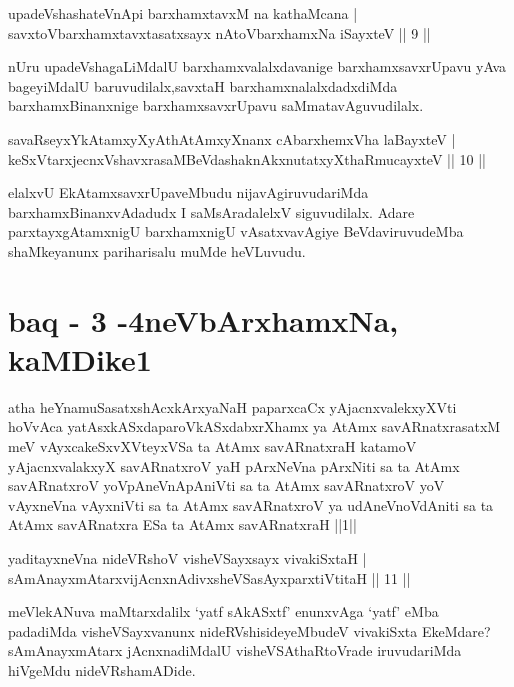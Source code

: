 
\begin{shl}
upadeVshashateVnApi barxhamxtavxM na kathaMcana |\\
savxtoV\s barxhamxtavxtasatxsayx nAtoV\s barxhamxNa iSayxteV \hfill || 9 ||
\end{shl}

\begin{artha}
nUru upadeVshagaLiMdalU barxhamxvalalxdavanige barxhamxsavxrUpavu yAva bageyiMdalU baruvudilalx,savxtaH barxhamxnalalxdadxdiMda barxhamxBinanxnige barxhamxsavxrUpavu saMmatavAguvudilalx.
\end{artha}

\begin{shl}
savaRseyxYkAtamxyXyAthAtAmxyXnanx cAbarxhemxVha laBayxteV |\\
keSxVtarxjecnxVshavxrasaMBeVdashaknAkxnutatxyXthaRmucayxteV \hfill || 10 ||
\end{shl}

\begin{artha}
elalxvU EkAtamxsavxrUpaveMbudu nijavAgiruvudariMda barxhamxBinanxvAdadudx I saMsAradalelxV siguvudilalx. Adare parxtayxgAtamxnigU barxhamxnigU vAsatxvavAgiye BeVdaviruvudeMba shaMkeyanunx pariharisalu muMde heVLuvudu.
\end{artha}

\section*{baq - 3 -4neVbArxhamxNa, kaMDike1}

\begin{shl}
atha heYnamuSasatxshAcxkArxyaNaH paparxcaCx yAjacnxvalekxyXVti hoVvAca yatAsxkASxdaparoVkASxdabxrXhamx ya AtAmx savARnatxrasatxM meV vAyxcakeSxvXVteyxVSa ta AtAmx savARnatxraH katamoV yAjacnxvalakxyX savARnatxroV yaH pArxNeVna pArxNiti sa ta AtAmx savARnatxroV yoV\s pAneVnApAniVti sa ta AtAmx savARnatxroV yoV vAyxneVna vAyxniVti sa ta AtAmx savARnatxroV ya udAneVnoVdAniti sa ta AtAmx savARnatxra ESa ta AtAmx savARnatxraH ||1||
\end{shl}


\begin{shl}
yaditayxneVna nideVRshoV visheVSayxsayx vivakiSxtaH |\\
sAmAnayxmAtarxvijAcnxnAdivxsheVSasAyxparxtiVtitaH \hfill || 11 ||
\end{shl}

\begin{artha}
meVlekANuva maMtarxdalilx `yatf sAkASxtf' enunxvAga `yatf' eMba padadiMda visheVSayxvanunx nideRVshisideyeMbudeV vivakiSxta EkeMdare? sAmAnayxmAtarx jAcnxnadiMdalU visheVSAthaRtoVrade iruvudariMda hiVgeMdu nideVRshamADide.
\end{artha}

